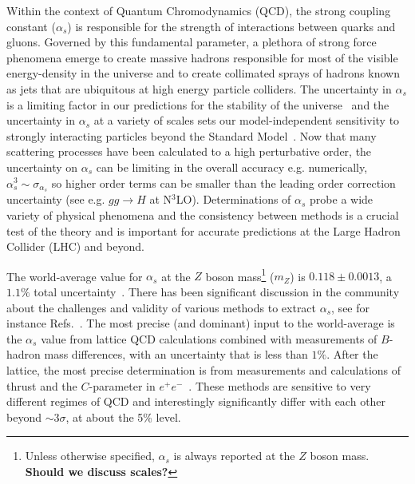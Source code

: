 



Within the context of Quantum Chromodynamics (QCD), the strong coupling constant ($\alpha_s$) is responsible for the strength of interactions between quarks and gluons.  Governed by this fundamental parameter, a plethora of strong force phenomena emerge to create massive hadrons responsible for most of the visible energy-density in the universe and to create collimated sprays of hadrons known as jets that are ubiquitous at high energy particle colliders.  The uncertainty in $\alpha_s$ is a limiting factor in our predictions for the stability of the universe~\cite{Andreassen:2017rzq} and the uncertainty in $\alpha_s$ at a variety of scales sets our model-independent sensitivity to strongly interacting particles beyond the Standard Model~\cite{Kaplan:2008pt,Becciolini:2014lya}.   Now that many scattering processes have been calculated to a high perturbative order, the uncertainty on $\alpha_s$ can be limiting in the overall accuracy e.g. numerically, $\alpha_s^3\sim \sigma_{\alpha_s}$ so higher order terms can be smaller than the leading order correction uncertainty (see e.g. $gg\rightarrow H$ at N$^3$LO).  Determinations of $\alpha_s$ probe a wide variety of physical phenomena and the consistency between methods is a crucial test of the theory and is important for accurate predictions at the Large Hadron Collider (LHC) and beyond.  


The world-average value for $\alpha_s$ at the $Z$ boson mass\footnote{Unless otherwise specified, $\alpha_s$ is always reported at the $Z$ boson mass.  \textbf{Should we discuss scales?}} ($m_Z$) is $0.118\pm 0.0013$, a $1.1\%$ total uncertainty~\cite{Olive:2016xmw}.  There has been significant discussion in the community about the challenges and validity of various methods to extract $\alpha_s$, see for instance Refs.~\cite{Bethke:2011tr,Pich:2013sqa,Moch:2014tta,dEnterria:2015kmd,Olive:2016xmw,Salam:2017qdl,Altarelli:2013bpa}.  The most precise (and dominant) input to the world-average is the $\alpha_s$ value from lattice QCD calculations combined with measurements of $B$-hadron mass differences, with an uncertainty that is less than $1\%$.   After the lattice, the most precise determination is from measurements and calculations of thrust and the $C$-parameter in $e^+e^-$~\cite{Abbate:2010xh,Hoang:2015hka,Heister:2003aj,Abdallah:2004xe,Abreu:1996mk,Abreu:1999rc,Biebel:1999zt,Adeva:1992gv,Abbiendi:2004qz,Abe:1994mf}.   These methods are sensitive to very different regimes of QCD and interestingly significantly differ with each other beyond $\sim 3\sigma$, at about the 5\% level.  

